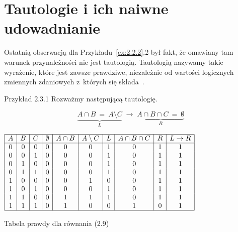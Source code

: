 \documentclass{SGGW-thesis}
\begin{document}
\newpage

\section{Tautologie i ich naiwne udowadnianie}

\begin{paragraph}{}
    Ostatnią obserwacją dla Przykładu~\ref{ex:2.2.2}.2 był fakt, że omawiany tam warunek przynależności nie jest tautologią. Tautologią nazywamy takie wyrażenie, które jest zawsze prawdziwe, niezależnie od wartości logicznych zmiennych zdaniowych z~których się składa~\cite[rozdz.~2.2]{ross2003discrete}.
\end{paragraph}

\begin{paragraph}{Przykład 2.3.1\label{ex:2.3.1}}
    Rozważmy następującą tautologię.

\begin{equation}
            \underbrace{A \cap B \: = \: A \setminus C}_L 
        \;\rightarrow\;
            \underbrace{A \cap B \cap C \: = \: \emptyset}_R
        \label{eq:example_tautology}
    \end{equation}
\begin{table}[h]
 \centering
        $\begin{array}{|c|c|c|c|c|c|c|c|c|c|}
            \hline
            A & B & C & \emptyset & A \cap B & A \setminus C & L & A \cap B \cap C & R & L \rightarrow R \\
            \hline
            0 & 0 & 0 & 0 & 0 & 0 & 1 & 0 & 1 & 1 \\
            0 & 0 & 1 & 0 & 0 & 0 & 1 & 0 & 1 & 1 \\
            0 & 1 & 0 & 0 & 0 & 0 & 1 & 0 & 1 & 1 \\
            0 & 1 & 1 & 0 & 0 & 0 & 1 & 0 & 1 & 1 \\
            1 & 0 & 0 & 0 & 0 & 1 & 0 & 0 & 1 & 1 \\
            1 & 0 & 1 & 0 & 0 & 0 & 1 & 0 & 1 & 1 \\
            1 & 1 & 0 & 0 & 1 & 1 & 1 & 0 & 1 & 1 \\
            1 & 1 & 1 & 0 & 1 & 0 & 0 & 1 & 0 & 1 \\
            \hline
        \end{array}$
        \caption{Tabela prawdy dla równania (2.9)}
        \label{table:example_tautology}
\end{table}
\end{paragraph}
\end{document}
